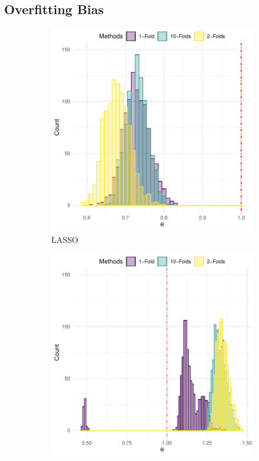 \documentclass[en,mtpro2]{elegantpaper}
\begin{document}
\subsection{Overfitting Bias}

\begin{figure}[htpb]
    \centering
    \begin{subfigure}{.45\textwidth}
        \centering
        \includegraphics[width=\linewidth]{figures/full-sample-vs-split-sample-lasso.pdf}
        \caption{LASSO}
    \end{subfigure}
    \begin{subfigure}{.45\textwidth}
        \centering
        \includegraphics[width=\linewidth]{figures/full-sample-vs-split-sample-rf.pdf}

\end{subfigure}
\end{figure}
\end{document}
